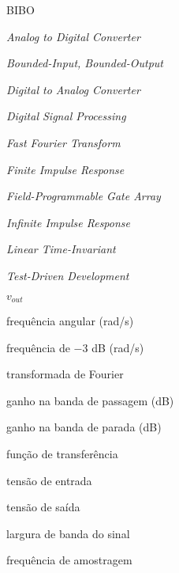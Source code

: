 \documentclass[tcc]{mdtufsm}
\begin{document}

\begin{listofabbrv}{BIBO}
\item[ADC] \textit{Analog to Digital Converter}
\item[BIBO] \textit{Bounded-Input, Bounded-Output}
\item[DAC] \textit{Digital to Analog Converter}
\item[DSP] \textit{Digital Signal Processing}
\item[FFT] \textit{Fast Fourier Transform}
\item[FIR] \textit{Finite Impulse Response}
\item[FPGA] \textit{Field-Programmable Gate Array}
\item[IIR] \textit{Infinite Impulse Response}
\item[LTI] \textit{Linear Time-Invariant}
\item[TDD] \textit{Test-Driven Development}
\end{listofabbrv}


\begin{listofsymbols}{$v_{out}$}
\item [$\omega$] frequência angular (rad/s)
\item [$\omega_c$] frequência de $-3$ dB (rad/s)
\item [$\mathcal{F}$] transformada de Fourier
\item [$G_p$] ganho na banda de passagem (dB)
\item [$G_s$] ganho na banda de parada (dB)
\item [$H$] função de transferência
\item [$v_i$] tensão de entrada
\item [$v_{out}$] tensão de saída
\item [$f_{bw}$] largura de banda do sinal
\item [$f_s$] frequência de amostragem
\end{listofsymbols}
\end{document}
